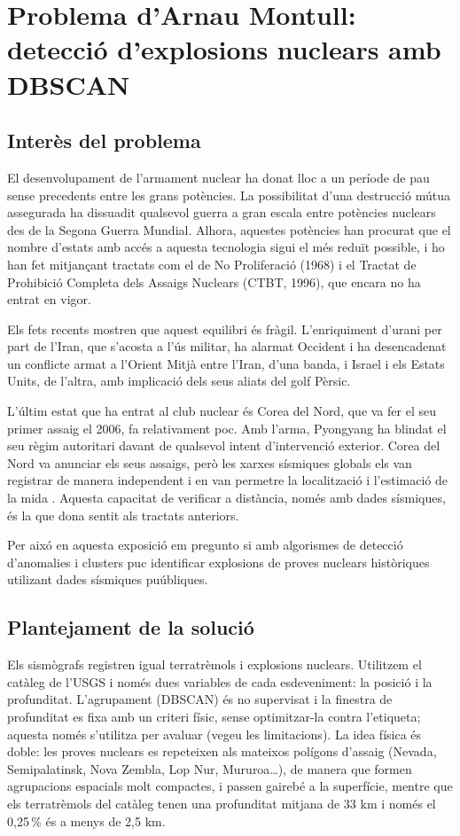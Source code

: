 \documentclass[a4paper,11pt]{article}
\begin{document}
\clearpage
\section{Problema d'Arnau Montull: detecció d'explosions nuclears amb DBSCAN}
\label{sec:arnau_nuclear}

\subsection{Interès del problema}
El desenvolupament de l'armament nuclear ha donat lloc a un període de pau sense precedents entre les grans potències.
La possibilitat d'una destrucció mútua assegurada ha dissuadit qualsevol guerra a gran escala entre potències nuclears
des de la Segona Guerra Mundial. Alhora, aquestes potències han procurat que el nombre d'estats amb accés a aquesta
tecnologia sigui el més reduït possible, i ho han fet mitjançant tractats com el de No Proliferació (1968) i el Tractat de
Prohibició Completa dels Assaigs Nuclears (CTBT, 1996), que encara no ha entrat en vigor.

Els fets recents mostren que aquest equilibri és fràgil. L'enriquiment d'urani per part de l'Iran, que s'acosta a l'ús
militar, ha alarmat Occident i ha desencadenat un conflicte armat a l'Orient Mitjà entre l'Iran, d'una banda, i Israel i els
Estats Units, de l'altra, amb implicació dels seus aliats del golf Pèrsic.

L'últim estat que ha entrat al club nuclear és Corea del Nord, que va fer el seu primer assaig el 2006, fa relativament poc. Amb l'arma, Pyongyang ha blindat el seu règim autoritari davant de qualsevol intent d'intervenció
exterior. Corea del Nord va anunciar els seus assaigs, però les xarxes sísmiques globals els van registrar de manera
independent i en van permetre la localització i l'estimació de la mida \cite{tian2018}. Aquesta capacitat de verificar a
distància, només amb dades sísmiques, és la que dona sentit als tractats anteriors. 

Per aixó en aquesta exposició em pregunto si amb algorismes de detecció d'anomalies i clusters puc identificar explosions de proves nuclears històriques utilizant dades sísmiques puúbliques.

\subsection{Plantejament de la solució}
Els sismògrafs registren igual terratrèmols i explosions nuclears. Utilitzem el catàleg de l'USGS i només dues variables
de cada esdeveniment: la posició i la profunditat. L'agrupament (DBSCAN) és no supervisat i la finestra de profunditat es
fixa amb un criteri físic, sense optimitzar-la contra l'etiqueta; aquesta només s'utilitza per avaluar (vegeu les
limitacions). La idea física és doble: les proves nuclears es repeteixen als mateixos polígons d'assaig (Nevada,
Semipalatinsk, Nova Zembla, Lop Nur, Mururoa\ldots), de manera que formen agrupacions espacials molt compactes, i passen
gairebé a la superfície, mentre que els terratrèmols del catàleg tenen una profunditat mitjana de 33 km i només el
0,25\,\% és a menys de 2,5 km.
\end{document}
